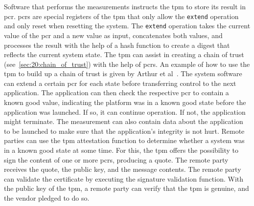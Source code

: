 Software that performs the measurements instructs the \gls{tpm} to store its
result in \gls{pcr}. \glspl{pcr} are special registers of the \gls{tpm} that
only allow the \texttt{extend} operation and only reset when resetting the
system. The \texttt{extend} operation takes the current value of the \gls{pcr}
and a new value as input, concatenates both values, and processes the result
with the help of a hash function to create a digest that reflects the current
system state. The \gls{tpm} can assist in creating a chain of trust
(see~\ref{sec:20:chain_of_trust}) with the help of \glspl{pcr}. An example of
how to use the \gls{tpm} to build up a chain of trust is given by Arthur et
al~\cite{arthur2015practical}. The system software can extend a certain
\gls{pcr} for each state before transferring control to the next application.
The application can then check the respective \gls{pcr} to contain a known good
value, indicating the platform was in a known good state before the application
was launched. If so, it can continue operation. If not, the application might
terminate. The measurement can also contain data about the application to be
launched to make sure that the application's integrity is not hurt. Remote
parties can use the \gls{tpm} attestation function to determine whether a system
was in a known good state at some time. For this, the \gls{tpm} offers the
possibility to sign the content of one or more \glspl{pcr}, producing a quote.
The remote party receives the quote, the public key, and the message contents.
The remote party can validate the certificate by executing the signature
validation function. With the public key of the \gls{tpm}, a remote party can
verify that the \gls{tpm} is genuine, and the vendor pledged to do so.
